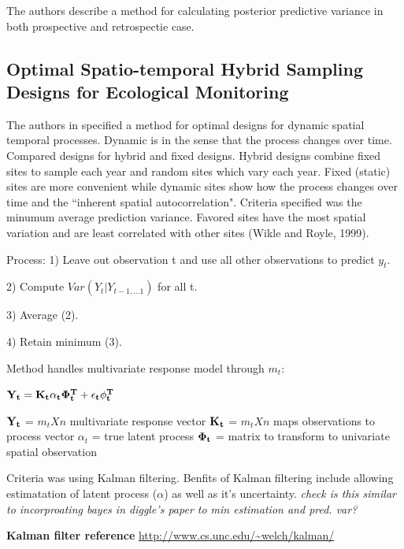 \documentclass[a4paper]{article}
\begin{document}
The authors describe a method for calculating posterior predictive variance in both prospective and retrospectie case. \cite{diggle2003}

\subsection*{Optimal Spatio-temporal Hybrid Sampling Designs for Ecological Monitoring}

The authors in \cite{hooten2009} specified a method for optimal designs for dynamic spatial temporal processes. Dynamic is in the sense that the process changes over time. Compared designs for hybrid and fixed designs. Hybrid designs combine fixed sites to sample each year and random sites which vary each year. Fixed (static) sites are more convenient while dynamic sites show how the process changes over time and the ``inherent spatial autocorrelation". Criteria specified was the minumum average prediction variance. Favored sites have the most spatial variation and are least correlated with other sites (Wikle and Royle, 1999).

Process:
1) Leave out observation t and use all other observations to predict $y_{t}$. 

2) Compute $Var(Y_{t} | Y_{t-1,...1})$ for all t.

3) Average (2).

4) Retain minimum (3).

Method handles multivariate response model through $m_{t}$:

\begin{center}
${\bf Y_{t}} = {\bf K_{t}\alpha_{t}\Phi_{t}^{T}} + {\bf \epsilon_{t}\phi_{t}^{T}}$
\end{center}

${\bf Y_{t}}$ = $m_{t} X n$ multivariate response vector
${\bf K_{t}}$ = $m_{t} X n$ maps observations to process vector
{\bf $\alpha_{t}$} = true latent process
${\bf \Phi_{t}}$ = matrix to transform to univariate spatial observation

Criteria was using Kalman filtering. Benfits of Kalman filtering include allowing estimatation of latent process ({\bf $\alpha$}) as well as it's uncertainty. {\it check is this similar to incorproating bayes in diggle's paper to min estimation and pred. var?}

\vspace{1in}

{\bf Kalman filter reference} \url{http://www.cs.unc.edu/~welch/kalman/}
\end{document}

